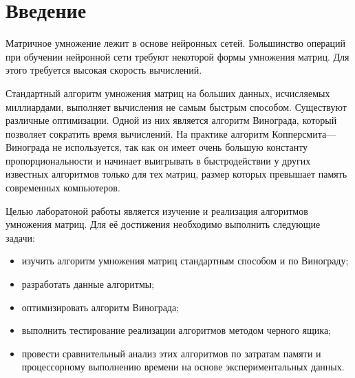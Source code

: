 \chapter*{Введение}
Матричное умножение лежит в основе нейронных сетей. Большинство операций при обучении нейронной сети требуют некоторой формы умножения матриц. Для этого требуется высокая скорость вычислений.

Стандартный алгоритм умножения матриц на больших данных, исчисляемых миллиардами, выполняет вычисления не самым быстрым способом. Существуют различные оптимизации. Одной из них является алгоритм Винограда, который позволяет сократить время вычислений. На практике алгоритм Копперсмита—Винограда не используется, так как он имеет очень большую константу пропорциональности и начинает выигрывать в быстродействии у других известных алгоритмов только для тех матриц, размер которых превышает память современных компьютеров.

Целью лаборатоной работы является изучение и реализация алгоритмов умножения матриц. Для её достижения необходимо выполнить следующие задачи:
\begin{itemize}
	\item изучить алгоритм умножения матриц стандартным способом и по Винограду;
	\item разработать данные алгоритмы;
	\item оптимизировать алгоритм Винограда;
	\item выполнить тестирование реализации алгоритмов методом черного ящика;
	\item провести сравнительный анализ этих алгоритмов по затратам памяти и процессорному выполнению времени на основе экспериментальных данных.
\end{itemize}